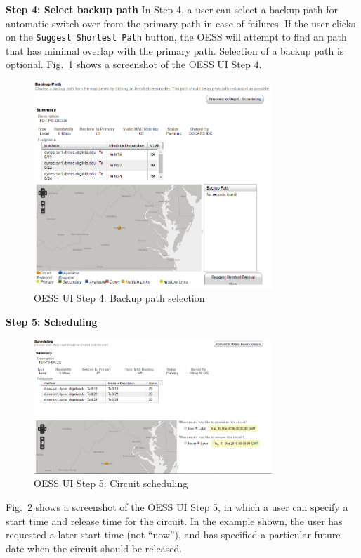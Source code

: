 \textbf{Step 4: Select backup path}
In Step 4, a user can select a backup path for automatic switch-over from the primary path in case of
failures. If the user clicks on the \texttt{Suggest Shortest Path} button, the OESS will attempt to find an path that has minimal overlap with the primary path.  Selection of a backup path is optional. Fig.~\ref{fig:oessbackup} shows a screenshot of the OESS UI Step 4.
\begin{figure}[htb!]
\centering
\includegraphics[width=0.8\textwidth]{figures/oess-backup.png}
\caption{OESS UI Step 4: Backup path selection}
\label{fig:oessbackup}
\end{figure}

\textbf{Step 5: Scheduling}
\begin{figure}[htb!]
\centering
\includegraphics[width=0.8\textwidth]{figures/oess-schedule.png}
\caption{OESS UI Step 5: Circuit scheduling}
\label{fig:oessschedule}
\end{figure}
Fig.~\ref{fig:oessschedule} shows a screenshot of the OESS UI Step 5, in which a user can specify
a start time and release time for the circuit. In the example shown, the user
has requested a later
start time (not ``now''), and has specified a particular future date when the circuit should be released.

